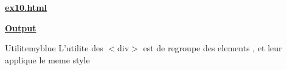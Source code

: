 \newpage
{}


\textbf{\underline{ex10.html}}
\vspace{0.1cm}



\vspace{1.25cm}

\textbf{\underline{Output}}

\vspace{0.1cm}
\begin{center}
\setlength{\fboxrule}{2pt} %
\end{center}

\vspace{0.25cm}
\begin{prettyBox}{Utilite}{myblue}
L'utilite des \(<\)div\(>\) est de regroupe des elements , et 
leur applique le meme style
\end{prettyBox}
